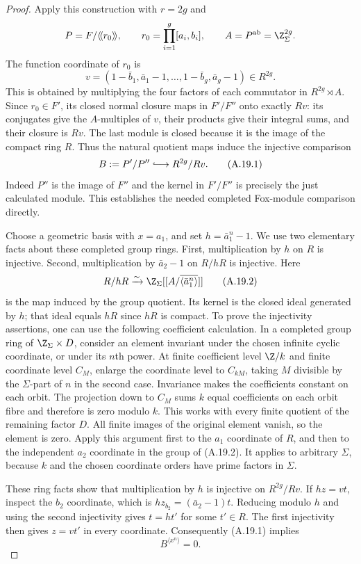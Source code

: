 \begin{proof}
Apply this construction with $r=2g$ and
\[
 P=F/\langle\!\langle r_0\rangle\!\rangle,
 \qquad r_0=\prod_{i=1}^g[a_i,b_i],
 \qquad A=P^{\mathrm{ab}}=\Z_\Sigma^{2g}.
\]
The function coordinate of $r_0$ is
\[
 v=(1-\bar b_1,\bar a_1-1,\ldots,1-\bar b_g,\bar a_g-1)\in R^{2g}.
\]
This is obtained by multiplying the four factors of each commutator in $R^{2g}\rtimes A$. Since $r_0\in F'$, its closed normal closure maps in $F'/F''$ onto exactly $Rv$: its conjugates give the $A$-multiples of $v$, their products give their integral sums, and their closure is $Rv$. The last module is closed because it is the image of the compact ring $R$. Thus the natural quotient maps induce the injective comparison
\[
 B:=P'/P''\lhook\joinrel\longrightarrow R^{2g}/Rv.                 \tag{A.19.1}
\]
Indeed $P''$ is the image of $F''$ and the kernel in $F'/F''$ is precisely the just calculated module. This establishes the needed completed Fox-module comparison directly.

Choose a geometric basis with $x=a_1$, and set $h=\bar a_1^n-1$. We use two elementary facts about these completed group rings. First, multiplication by $h$ on $R$ is injective. Second, multiplication by $\bar a_2-1$ on $R/hR$ is injective. Here
\[
 R/hR\xrightarrow{\sim}
 \Z_\Sigma[[A/\overline{\langle\bar a_1^n\rangle}]]                \tag{A.19.2}
\]
is the map induced by the group quotient. Its kernel is the closed ideal generated by $h$; that ideal equals $hR$ since $hR$ is compact. To prove the injectivity assertions, one can use the following coefficient calculation. In a completed group ring of $\Z_\Sigma\times D$, consider an element invariant under the chosen infinite cyclic coordinate, or under its $n$th power. At finite coefficient level $\Z/k$ and finite coordinate level $C_M$, enlarge the coordinate level to $C_{kM}$, taking $M$ divisible by the $\Sigma$-part of $n$ in the second case. Invariance makes the coefficients constant on each orbit. The projection down to $C_M$ sums $k$ equal coefficients on each orbit fibre and therefore is zero modulo $k$. This works with every finite quotient of the remaining factor $D$. All finite images of the original element vanish, so the element is zero. Apply this argument first to the $a_1$ coordinate of $R$, and then to the independent $a_2$ coordinate in the group of (A.19.2). It applies to arbitrary $\Sigma$, because $k$ and the chosen coordinate orders have prime factors in $\Sigma$.

These ring facts show that multiplication by $h$ is injective on $R^{2g}/Rv$. If $hz=vt$, inspect the $b_2$ coordinate, which is $h z_{b_2}=(\bar a_2-1)t$. Reducing modulo $h$ and using the second injectivity gives $t=ht'$ for some $t'\in R$. The first injectivity then gives $z=vt'$ in every coordinate. Consequently (A.19.1) implies
\[
 B^{\langle x^n\rangle}=0.                                      \tag{A.19.3}
\]


\end{proof}
